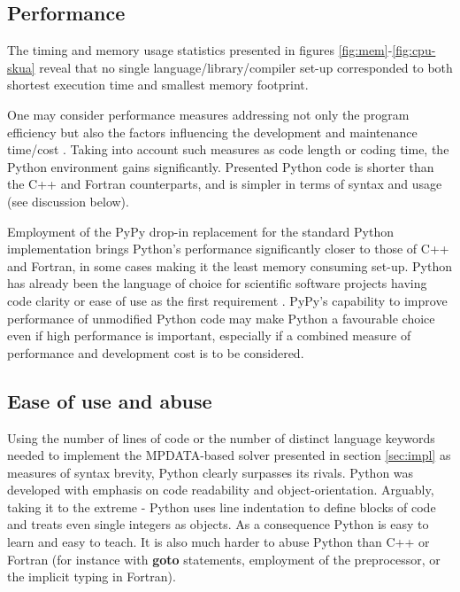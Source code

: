 \documentclass[review,peprint,10pt,5p,times]{elsarticle}
\newcommand{\prog}[1]{{\rm\bf#1}}
\begin{document}
  \subsection{Performance}
  
  The timing and memory usage statistics presented in figures \ref{fig:mem}-\ref{fig:cpu-skua}
    reveal that no single language/library/compiler set-up 
    corresponded to both shortest execution time and smallest memory footprint.

  One may consider performance measures addressing not only the program efficiency but also 
    the factors influencing the development and maintenance time/cost 
    \citep[of particular importance in scientific computing,][]{Wilson_2006}.
  Taking into account such measures as code length or coding time,
    the Python environment gains significantly.
  Presented Python code is shorter than the C++ and Fortran counterparts,
    and is simpler in terms of syntax and usage (see discussion below).

  Employment of the PyPy drop-in replacement for the standard Python implementation brings 
    Python's performance significantly closer to those of C++ and Fortran, in some
    cases making it the least memory consuming set-up.
  Python has already been the language of choice for scientific software projects having code clarity 
    or ease of use as the first requirement \citep[see e.g.][]{Barnes_and_Jones_2011}.
  PyPy's capability to improve performance of unmodified Python code may 
    make Python a favourable choice even if high performance is important, especially
    if a combined measure of performance and development cost is to be considered. 

  \subsection{Ease of use and abuse}

  Using the number of lines of code or the number of distinct language keywords
    needed to implement the MPDATA-based
    solver presented in section \ref{sec:impl} as measures of syntax 
    brevity, Python clearly surpasses its rivals.
  Python was developed with emphasis on code readability and object-orientation.
  Arguably, taking it to the extreme - Python uses line indentation to define 
    blocks of code and treats even single integers as objects.
  As a consequence Python is easy to learn and easy to teach.
  It is also much harder to abuse Python than C++ or Fortran
    (for instance with \prog{goto} statements, employment of the preprocessor,
    or the implicit typing in Fortran).
\end{document}
